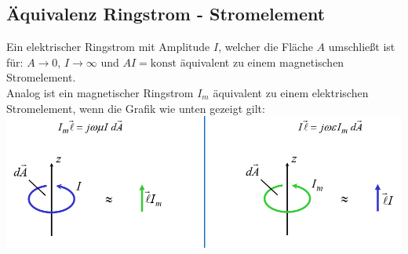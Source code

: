 \documentclass[english]{latex4ei/latex4ei_sheet}
\begin{document}
\begin{sectionbox}
\subsection{Äquivalenz Ringstrom - Stromelement}
Ein elektrischer Ringstrom mit Amplitude $I$, welcher die Fläche $A$ umschließt ist für: $A\to 0$, $I \to \infty$ und $AI = \text{konst}$ äquivalent zu einem magnetischen Stromelement.\\
Analog ist ein magnetischer Ringstrom $I_m$ äquivalent zu einem elektrischen Stromelement, wenn die Grafik wie unten gezeigt gilt:\\
\includegraphics[width=\textwidth]{./img/antennen_ringstrom_zwei.png}
\end{sectionbox}
\end{document}
